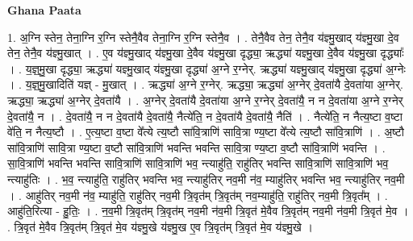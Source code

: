 \documentclass[17pt]{extarticle}
\begin{document}
\textbf{Ghana Paata } \newline

1. अ॒ग्नि स्तेन॒ तेना॒ग्नि र॒ग्नि स्तेनै॒वैव तेना॒ग्नि र॒ग्नि स्तेनै॒व । . तेनै॒वैव तेन॒ तेनै॒व य॑ज्ञ्मु॒खाद् य॑ज्ञ्मु॒खा दे॒व तेन॒ तेनै॒व य॑ज्ञ्मु॒खात् । . ए॒व य॑ज्ञ्मु॒खाद् य॑ज्ञ्मु॒खा दे॒वैव य॑ज्ञ्मु॒खा दृद्ध्या॒ ऋद्ध्या॑ यज्ञ्मु॒खा दे॒वैव य॑ज्ञ्मु॒खा दृद्ध्याः᳚ । . य॒ज्ञ्॒मु॒खा दृद्ध्या॒ ऋद्ध्या॑ यज्ञ्मु॒खाद् य॑ज्ञ्मु॒खा दृद्ध्या॑ अ॒ग्ने र॒ग्नेर्. ऋद्ध्या॑ यज्ञ्मु॒खाद् य॑ज्ञ्मु॒खा दृद्ध्या॑ अ॒ग्नेः । . य॒ज्ञ्॒मु॒खादिति॑ यज्ञ् - मु॒खात् । . ऋद्ध्या॑ अ॒ग्ने र॒ग्नेर्. ऋद्ध्या॒ ऋद्ध्या॑ अ॒ग्नेर् दे॒वता॑यै दे॒वता॑या अ॒ग्नेर्. ऋद्ध्या॒ ऋद्ध्या॑ अ॒ग्नेर् दे॒वता॑यै । . अ॒ग्नेर् दे॒वता॑यै दे॒वता॑या अ॒ग्ने र॒ग्नेर् दे॒वता॑यै॒ न न दे॒वता॑या अ॒ग्ने र॒ग्नेर् दे॒वता॑यै॒ न । . दे॒वता॑यै॒ न न दे॒वता॑यै दे॒वता॑यै॒ नैत्ये॑ति॒ न दे॒वता॑यै दे॒वता॑यै॒ नैति॑ । . नैत्ये॑ति॒ न नैत्य॒ष्टा व॒ष्टा वे॑ति॒ न नैत्य॒ष्टौ । . ए॒त्य॒ष्टा व॒ष्टा वे᳚त्ये त्य॒ष्टौ सा॑वि॒त्राणि॑ सावि॒त्रा ण्य॒ष्टा वे᳚त्ये त्य॒ष्टौ सा॑वि॒त्राणि॑ । . अ॒ष्टौ सा॑वि॒त्राणि॑ सावि॒त्रा ण्य॒ष्टा व॒ष्टौ सा॑वि॒त्राणि॑ भवन्ति भवन्ति सावि॒त्रा ण्य॒ष्टा व॒ष्टौ सा॑वि॒त्राणि॑ भवन्ति । . सा॒वि॒त्राणि॑ भवन्ति भवन्ति सावि॒त्राणि॑ सावि॒त्राणि॑ भव॒ न्त्याहु॑ति॒ राहु॑तिर् भवन्ति सावि॒त्राणि॑ सावि॒त्राणि॑ भव॒ न्त्याहु॑तिः । . भ॒व॒ न्त्याहु॑ति॒ राहु॑तिर् भवन्ति भव॒ न्त्याहु॑तिर् नव॒मी न॑व॒ म्याहु॑तिर् भवन्ति भव॒ न्त्याहु॑तिर् नव॒मी । . आहु॑तिर् नव॒मी न॑व॒ म्याहु॑ति॒ राहु॑तिर् नव॒मी त्रि॒वृत॑म् त्रि॒वृत॑म् नव॒म्याहु॑ति॒ राहु॑तिर् नव॒मी त्रि॒वृत᳚म् । . आहु॑ति॒रित्या - हु॒तिः॒ । . न॒व॒मी त्रि॒वृत॑म् त्रि॒वृत॑म् नव॒मी न॑व॒मी त्रि॒वृत॑ मे॒वैव त्रि॒वृत॑म् नव॒मी न॑व॒मी त्रि॒वृत॑ मे॒व । . त्रि॒वृत॑ मे॒वैव त्रि॒वृत॑म् त्रि॒वृत॑ मे॒व य॑ज्ञ्मु॒खे य॑ज्ञ्मु॒ख ए॒व त्रि॒वृत॑म् त्रि॒वृत॑ मे॒व य॑ज्ञ्मु॒खे । \newline
\end{document}
